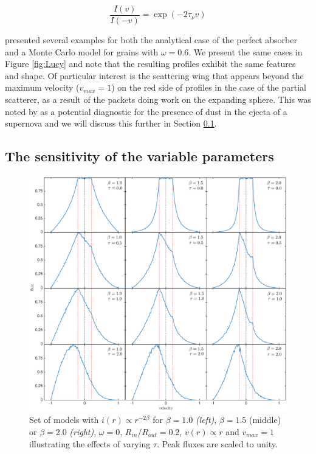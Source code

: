\documentclass[useAMS,usenatbib,usegraphicx]{mnras}
\begin{document}
\begin{equation}
\frac{I(v)}{I(-v)} = \exp(-2\tau_{\nu} v)  
\end{equation}

\citet{Lucy1989} presented several examples for both the analytical case of 
the perfect absorber and a Monte Carlo model for grains with $\omega 
=0.6$.  We present the same cases in Figure \ref{fig:Lucy} and note that 
the resulting profiles exhibit the same features and shape. Of particular 
interest is the scattering wing that appears beyond the maximum velocity 
($v_{max}=1$) on the red side of profiles in the case of the partial 
scatterer, as a result of the packets doing work on the expanding sphere.  
This was noted by \citet{Lucy1989} as a potential diagnostic for the 
presence of dust in the ejecta of a supernova and we will discuss this 
further in Section \ref{ps}.


\subsection{The sensitivity of the variable parameters}
\label{ps}

\begin{figure}
\includegraphics[trim =80 10 6 15,clip=true,scale=0.515]{params/D/newDall} 
\caption{Set of models with $i(r) \propto r^{-2\beta}$ for $\beta=1.0$ \textit{(left)}, $\beta=1.5$ (middle) or $\beta=2.0$ \textit{(right)}, $\omega=0$, 
$R_{in}/R_{out}=0.2$, $v(r) \propto r$ and $v_{max}=1$ illustrating the effects of varying 
$\tau$.  Peak fluxes are scaled to unity.}
\label{bt}
\end{figure}
\end{document}
